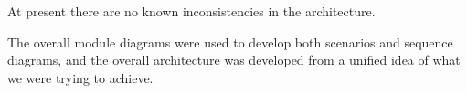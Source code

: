 At present there are no known inconsistencies in the architecture.

The overall module diagrams were used to develop both scenarios and
sequence diagrams, and the overall architecture was developed from a unified
idea of what we were trying to achieve.